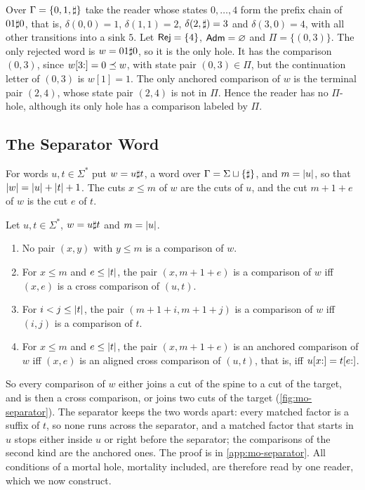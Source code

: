\begin{example}\label{ex:mo-unanchored}
Over $\Gamma=\{0,1,\sharp\}$ take the reader whose states $0,\ldots,4$ form the
prefix chain of $01\sharp0$, that is, $\delta(0,0)=1$, $\delta(1,1)=2$,
$\delta(2,\sharp)=3$ and $\delta(3,0)=4$, with all other transitions into a
sink $5$. Let $\mathsf{Rej}=\{4\}$, $\mathsf{Adm}=\varnothing$ and $\Pi=\{(0,3)\}$. The only
rejected word is $w=01\sharp0$, so it is the only hole. It has the comparison
$(0,3)$, since $w[3{:}]=0\preceq w$, with state pair $(0,3)\in\Pi$, but the
continuation letter of $(0,3)$ is $w[1]=1$. The only anchored comparison of
$w$ is the terminal pair $(2,4)$, whose state pair $(2,4)$ is not in $\Pi$.
Hence the reader has no $\Pi$-hole, although its only hole has a comparison
labeled by $\Pi$.
\end{example}

\subsection{The Separator Word}\label{sec:mo-separator}

For words $u,t\in\Sigma^*$ put $w=u\sharp t$, a word over
$\Gamma=\Sigma\sqcup\{\sharp\}$, and $m=\lvert u\rvert$, so that $\lvert w\rvert=\lvert u\rvert+\lvert t\rvert+1$.
The cuts $x\le m$ of $w$ are the cuts of $u$, and the cut $m+1+e$ of $w$ is the
cut $e$ of $t$.

\begin{lemma}\label{lem:mo-sep}
Let $u,t\in\Sigma^*$, $w=u\sharp t$ and $m=\lvert u\rvert$.
\begin{enumerate}[label=(\roman*),leftmargin=*]
\item No pair $(x,y)$ with $y\le m$ is a comparison of $w$.
\item For $x\le m$ and $e\le\lvert t\rvert$, the pair $(x,m+1+e)$ is a comparison of
  $w$ iff $(x,e)$ is a cross comparison of $(u,t)$.
\item For $i<j\le\lvert t\rvert$, the pair $(m+1+i,m+1+j)$ is a comparison of $w$ iff
  $(i,j)$ is a comparison of $t$.
\item For $x\le m$ and $e\le\lvert t\rvert$, the pair $(x,m+1+e)$ is an anchored
  comparison of $w$ iff $(x,e)$ is an aligned cross comparison of $(u,t)$, that
  is, iff $u[x{:}]=t[e{:}]$.
\end{enumerate}
\end{lemma}

So every comparison of $w$ either joins a cut of the spine to a cut of the
target, and is then a cross comparison, or joins two cuts of the target
(\cref{fig:mo-separator}). The separator keeps the two words apart: every
matched factor is a suffix of $t$, so none runs across the separator, and a
matched factor that starts in $u$ stops either inside $u$ or right before the
separator; the comparisons of the second kind are the anchored ones. The proof
is in \cref{app:mo-separator}. All conditions of a mortal hole, mortality
included, are therefore read by one reader, which we now construct.


